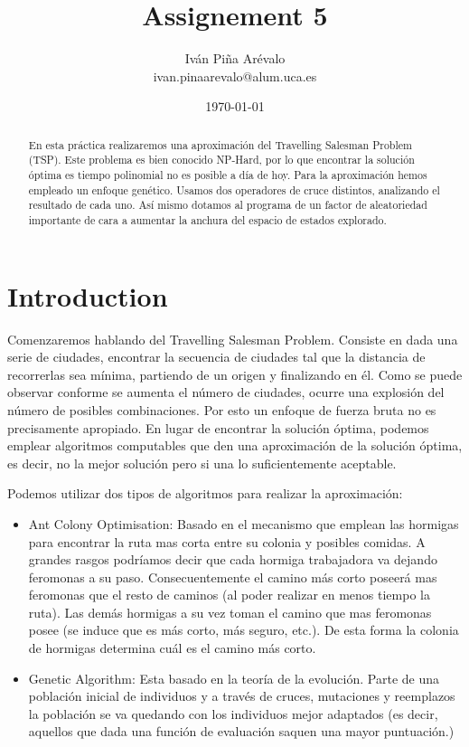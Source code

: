 \documentclass{article}
\title{Assignement 5}
\author{Iván Piña Arévalo \\ ivan.pinaarevalo@alum.uca.es}
\date{\today}
\begin{document}
\maketitle

\newpage
\begin{abstract}
    En esta práctica realizaremos una aproximación del Travelling Salesman Problem (TSP). Este problema es bien conocido 
    NP-Hard, por lo que encontrar la solución óptima es tiempo polinomial no es posible a día de hoy.  Para la aproximación hemos 
    empleado un enfoque genético. Usamos dos operadores de cruce distintos, analizando el resultado de cada uno. Así mismo 
    dotamos al programa de un factor de aleatoriedad importante de cara a aumentar la anchura del espacio de estados explorado. 
\end{abstract}

\newpage
\section{Introduction}
    Comenzaremos hablando del Travelling Salesman Problem. Consiste en dada una serie de ciudades, encontrar la secuencia de ciudades tal que la distancia de recorrerlas 
    sea mínima, partiendo de un origen y finalizando en él. Como se puede observar conforme se aumenta el número de ciudades, ocurre
    una explosión del número de posibles combinaciones. Por esto un enfoque de fuerza bruta no es precisamente apropiado. En lugar 
    de encontrar la solución óptima, podemos emplear algoritmos computables que den una aproximación de la solución óptima, es decir, 
    no la mejor solución pero si una lo suficientemente aceptable. 

    Podemos utilizar dos tipos de algoritmos para realizar la aproximación:
    \begin{itemize}
        \item Ant Colony Optimisation: Basado en el mecanismo que emplean las hormigas para encontrar la ruta mas corta 
        entre su colonia y posibles comidas. A grandes rasgos podríamos decir que cada hormiga trabajadora va dejando feromonas 
        a su paso. Consecuentemente el camino más corto poseerá mas feromonas que el resto de caminos (al poder realizar en menos 
        tiempo la ruta). Las demás hormigas a su vez toman el camino que mas feromonas posee (se induce que es más corto, más seguro, etc.).
        De esta forma la colonia de hormigas determina cuál es el camino más corto. 
        \item Genetic Algorithm: Esta basado en la teoría de la evolución. Parte de una población inicial de individuos y a través 
        de cruces, mutaciones y reemplazos la población se va quedando con los individuos mejor adaptados (es decir, aquellos que 
        dada una función de evaluación saquen una mayor puntuación.)
    \end{itemize}
\end{document}
